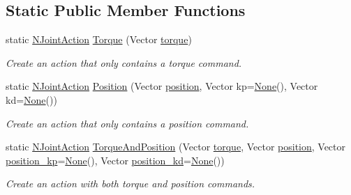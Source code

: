 \subsection*{Static Public Member Functions}
\begin{DoxyCompactItemize}
\item 
static \hyperlink{structrobot__interfaces_1_1NJointAction}{N\+Joint\+Action} \hyperlink{structrobot__interfaces_1_1NJointAction_ad1e48599cf7ce7b154464db23978a3c2}{Torque} (Vector \hyperlink{structrobot__interfaces_1_1NJointAction_aab60be78c0008092bf3f36b92a25245d}{torque})
\begin{DoxyCompactList}\small\item\em Create an action that only contains a torque command. \end{DoxyCompactList}\item 
static \hyperlink{structrobot__interfaces_1_1NJointAction}{N\+Joint\+Action} \hyperlink{structrobot__interfaces_1_1NJointAction_ab90dfaabbae281108bf83337f455143c}{Position} (Vector \hyperlink{structrobot__interfaces_1_1NJointAction_a1ba640ac58fef08cd8a5c964b7a4096f}{position}, Vector kp=\hyperlink{structrobot__interfaces_1_1NJointAction_abb5403bb946dc4b9e9e5e13b9195ad86}{None}(), Vector kd=\hyperlink{structrobot__interfaces_1_1NJointAction_abb5403bb946dc4b9e9e5e13b9195ad86}{None}())
\begin{DoxyCompactList}\small\item\em Create an action that only contains a position command. \end{DoxyCompactList}\item 
static \hyperlink{structrobot__interfaces_1_1NJointAction}{N\+Joint\+Action} \hyperlink{structrobot__interfaces_1_1NJointAction_a4c779f6bc160922b65d3a78d0b561f01}{Torque\+And\+Position} (Vector \hyperlink{structrobot__interfaces_1_1NJointAction_aab60be78c0008092bf3f36b92a25245d}{torque}, Vector \hyperlink{structrobot__interfaces_1_1NJointAction_a1ba640ac58fef08cd8a5c964b7a4096f}{position}, Vector \hyperlink{structrobot__interfaces_1_1NJointAction_a4100b04d42c8e1d9b04ba141212c3461}{position\+\_\+kp}=\hyperlink{structrobot__interfaces_1_1NJointAction_abb5403bb946dc4b9e9e5e13b9195ad86}{None}(), Vector \hyperlink{structrobot__interfaces_1_1NJointAction_a652131480e656840e53f8709dae9c487}{position\+\_\+kd}=\hyperlink{structrobot__interfaces_1_1NJointAction_abb5403bb946dc4b9e9e5e13b9195ad86}{None}())
\begin{DoxyCompactList}\small\item\em Create an action with both torque and position commands. \end{DoxyCompactList}\item 

\end{DoxyCompactItemize}

